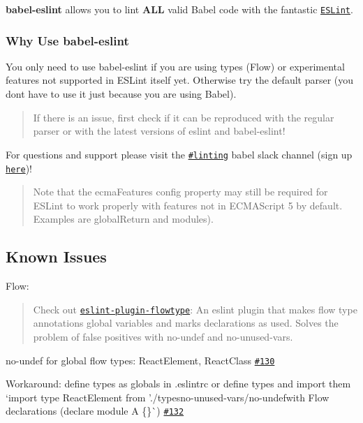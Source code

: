 {\bfseries babel-\/eslint} allows you to lint {\bfseries A\+LL} valid Babel code with the fantastic \href{https://github.com/eslint/eslint}{\tt E\+S\+Lint}.

\subsubsection*{Why Use babel-\/eslint}

You only need to use babel-\/eslint if you are using types (Flow) or experimental features not supported in E\+S\+Lint itself yet. Otherwise try the default parser (you don\textquotesingle{}t have to use it just because you are using Babel). 



\begin{quote}
If there is an issue, first check if it can be reproduced with the regular parser or with the latest versions of {\ttfamily eslint} and {\ttfamily babel-\/eslint}! \end{quote}


For questions and support please visit the \href{https://babeljs.slack.com/messages/linting/}{\tt {\ttfamily \#linting}} babel slack channel (sign up \href{https://babel-slack.herokuapp.com}{\tt here})!

\begin{quote}
Note that the {\ttfamily ecma\+Features} config property may still be required for E\+S\+Lint to work properly with features not in E\+C\+M\+A\+Script 5 by default. Examples are {\ttfamily global\+Return} and {\ttfamily modules}). \end{quote}


\subsection*{Known Issues}

Flow\+: \begin{quote}
Check out \href{https://github.com/gajus/eslint-plugin-flowtype}{\tt eslint-\/plugin-\/flowtype}\+: An {\ttfamily eslint} plugin that makes flow type annotations global variables and marks declarations as used. Solves the problem of false positives with {\ttfamily no-\/undef} and {\ttfamily no-\/unused-\/vars}. \end{quote}

\begin{DoxyItemize}
\item {\ttfamily no-\/undef} for global flow types\+: {\ttfamily React\+Element}, {\ttfamily React\+Class} \href{https://github.com/babel/babel-eslint/issues/130#issuecomment-111215076}{\tt \#130}
\begin{DoxyItemize}
\item Workaround\+: define types as globals in {\ttfamily .eslintrc} or define types and import them `import type React\+Element from './types\textquotesingle{}{\ttfamily  -\/}no-\/unused-\/vars/no-\/undef{\ttfamily with Flow declarations (}declare module A \{\}\`{}) \href{https://github.com/babel/babel-eslint/issues/132#issuecomment-112815926}{\tt \#132}
\end{DoxyItemize}
\end{DoxyItemize}

